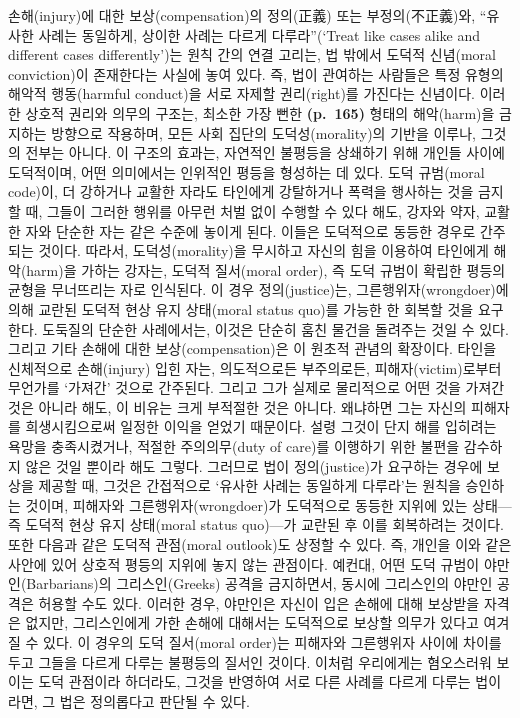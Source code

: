 손해(injury)에 대한 보상(compensation)의 정의(正義) 또는
부정의(不正義)와, ``유사한 사례는 동일하게, 상이한 사례는 다르게
다루라''(`Treat like cases alike and different cases differently')는
원칙 간의 연결 고리는, 법 밖에서 도덕적 신념(moral conviction)이
존재한다는 사실에 놓여 있다. 즉, 법이 관여하는 사람들은 특정 유형의
해악적 행동(harmful conduct)을 서로 자제할 권리(right)를 가진다는
신념이다. 이러한 상호적 권리와 의무의 구조는, 최소한 가장 뻔한
\textbf{(p.~165)} 형태의 해악(harm)을 금지하는 방향으로 작용하며, 모든
사회 집단의 도덕성(morality)의 기반을 이루나, 그것의 전부는 아니다. 이
구조의 효과는, 자연적인 불평등을 상쇄하기 위해 개인들 사이에 도덕적이며,
어떤 의미에서는 인위적인 평등을 형성하는 데 있다. 도덕 규범(moral
code)이, 더 강하거나 교활한 자라도 타인에게 강탈하거나 폭력을 행사하는
것을 금지할 때, 그들이 그러한 행위를 아무런 처벌 없이 수행할 수 있다
해도, 강자와 약자, 교활한 자와 단순한 자는 같은 수준에 놓이게 된다.
이들은 도덕적으로 동등한 경우로 간주되는 것이다. 따라서,
도덕성(morality)을 무시하고 자신의 힘을 이용하여 타인에게 해악(harm)을
가하는 강자는, 도덕적 질서(moral order), 즉 도덕 규범이 확립한 평등의
균형을 무너뜨리는 자로 인식된다. 이 경우 정의(justice)는,
그른행위자(wrongdoer)에 의해 교란된 도덕적 현상 유지 상태(moral status
quo)를 가능한 한 회복할 것을 요구한다. 도둑질의 단순한 사례에서는,
이것은 단순히 훔친 물건을 돌려주는 것일 수 있다. 그리고 기타 손해에 대한
보상(compensation)은 이 원초적 관념의 확장이다. 타인을 신체적으로
손해(injury) 입힌 자는, 의도적으로든 부주의로든, 피해자(victim)로부터
무언가를 `가져간' 것으로 간주된다. 그리고 그가 실제로 물리적으로 어떤
것을 가져간 것은 아니라 해도, 이 비유는 크게 부적절한 것은 아니다.
왜냐하면 그는 자신의 피해자를 희생시킴으로써 일정한 이익을 얻었기
때문이다. 설령 그것이 단지 해를 입히려는 욕망을 충족시켰거나, 적절한
주의의무(duty of care)를 이행하기 위한 불편을 감수하지 않은 것일 뿐이라
해도 그렇다. 그러므로 법이 정의(justice)가 요구하는 경우에 보상을 제공할
때, 그것은 간접적으로 `유사한 사례는 동일하게 다루라'는 원칙을 승인하는
것이며, 피해자와 그른행위자(wrongdoer)가 도덕적으로 동등한 지위에 있는
상태---즉 도덕적 현상 유지 상태(moral status quo)---가 교란된 후 이를
회복하려는 것이다. 또한 다음과 같은 도덕적 관점(moral outlook)도 상정할
수 있다. 즉, 개인을 이와 같은 사안에 있어 상호적 평등의 지위에 놓지 않는
관점이다. 예컨대, 어떤 도덕 규범이 야만인(Barbarians)의 그리스인(Greeks)
공격을 금지하면서, 동시에 그리스인의 야만인 공격은 허용할 수도 있다.
이러한 경우, 야만인은 자신이 입은 손해에 대해 보상받을 자격은 없지만,
그리스인에게 가한 손해에 대해서는 도덕적으로 보상할 의무가 있다고 여겨질
수 있다. 이 경우의 도덕 질서(moral order)는 피해자와 그른행위자 사이에
차이를 두고 그들을 다르게 다루는 불평등의 질서인 것이다. 이처럼
우리에게는 혐오스러워 보이는 도덕 관점이라 하더라도, 그것을 반영하여
서로 다른 사례를 다르게 다루는 법이라면, 그 법은 정의롭다고 판단될 수
있다.

